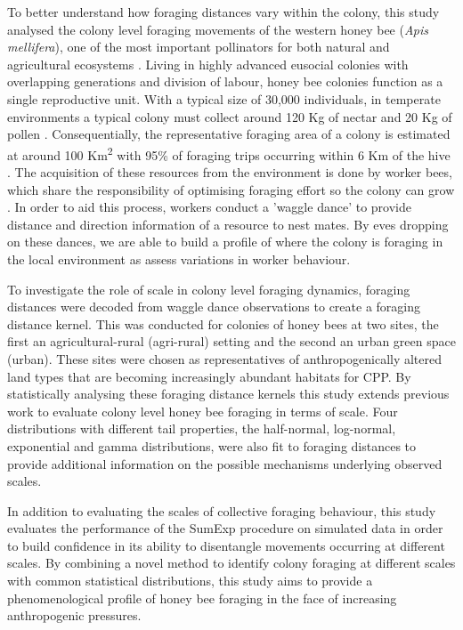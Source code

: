 \documentclass[11pt,usenames,dvipsnames]{article}
\begin{document}
\begin{linenumbers}
To better understand how foraging distances vary within the colony, this study analysed the colony level foraging movements of the western honey bee (\textit{Apis mellifera}), one of the most important pollinators for both natural and agricultural ecosystems \citep{Albrecht2018}. Living in highly advanced eusocial colonies with overlapping generations and division of labour, honey bee colonies function as a single reproductive unit. With a typical size of 30,000 individuals, in temperate environments a typical colony must collect around 120 Kg of nectar and 20 Kg of pollen \citep{Seeley1995}. Consequentially, the representative foraging area of a colony is estimated at around 100 Km\textsuperscript{2} with 95\% of foraging trips occurring within 6 Km of the hive \citep{Samuelson2017}. The acquisition of these resources from the environment is done by worker bees, which share the responsibility of optimising foraging effort so the colony can grow \citep{Samuelson2017}. In order to aid this process, workers conduct a 'waggle dance' to provide distance and direction information of a resource to nest mates. By eves dropping on these dances, we are able to build a profile of where the colony is foraging in the local environment as assess variations in worker behaviour.

To investigate the role of scale in colony level foraging dynamics, foraging distances were decoded from waggle dance observations to create a foraging distance kernel. This was conducted for colonies of honey bees at two sites, the first an agricultural-rural (agri-rural) setting and the second an urban green space (urban). These sites were chosen as representatives of anthropogenically altered land types that are becoming increasingly abundant habitats for CPP. By statistically analysing these foraging distance kernels this study extends previous work to evaluate colony level honey bee foraging in terms of scale. Four distributions with different tail properties, the half-normal, log-normal, exponential and gamma distributions, were also fit to foraging distances to provide additional information on the possible mechanisms underlying observed scales.

In addition to evaluating the scales of collective foraging behaviour, this study evaluates the performance of the SumExp procedure on simulated data in order to build confidence in its ability to disentangle movements occurring at different scales. By combining a novel method to identify colony foraging at different scales with common statistical distributions, this study aims to provide a phenomenological profile of honey bee foraging in the face of increasing anthropogenic pressures.
\end{linenumbers}
	
\end{document}

